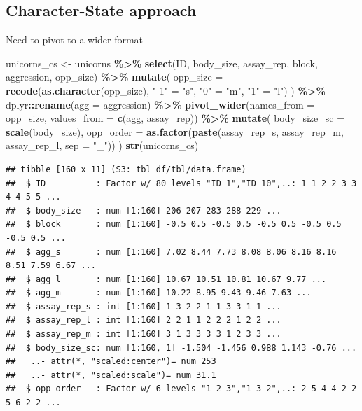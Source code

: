 \documentclass[
  12pt,
]{book}
\newenvironment{Shaded}{\begin{snugshade}}{\end{snugshade}}
\newcommand{\DataTypeTok}[1]{\textcolor[rgb]{0.13,0.29,0.53}{#1}}
\newcommand{\KeywordTok}[1]{\textcolor[rgb]{0.13,0.29,0.53}{\textbf{#1}}}
\newcommand{\NormalTok}[1]{#1}
\newcommand{\OperatorTok}[1]{\textcolor[rgb]{0.81,0.36,0.00}{\textbf{#1}}}
\newcommand{\StringTok}[1]{\textcolor[rgb]{0.31,0.60,0.02}{#1}}
\begin{document}
\hypertarget{character-state-approach}{%
\subsection{Character-State approach}\label{character-state-approach}}

Need to pivot to a wider format

\begin{Shaded}
\begin{Highlighting}[]
\NormalTok{unicorns\_cs \textless{}{-}}\StringTok{ }\NormalTok{unicorns }\OperatorTok{\%\textgreater{}\%}
\StringTok{  }\KeywordTok{select}\NormalTok{(ID, body\_size, assay\_rep, block, aggression, opp\_size) }\OperatorTok{\%\textgreater{}\%}
\StringTok{  }\KeywordTok{mutate}\NormalTok{(}
    \DataTypeTok{opp\_size =} \KeywordTok{recode}\NormalTok{(}\KeywordTok{as.character}\NormalTok{(opp\_size), }\StringTok{"{-}1"}\NormalTok{ =}\StringTok{ "s"}\NormalTok{, }\StringTok{"0"}\NormalTok{ =}\StringTok{ "m"}\NormalTok{, }\StringTok{"1"}\NormalTok{ =}\StringTok{ "l"}\NormalTok{)}
\NormalTok{  ) }\OperatorTok{\%\textgreater{}\%}
\StringTok{  }\NormalTok{dplyr}\OperatorTok{::}\KeywordTok{rename}\NormalTok{(}\DataTypeTok{agg =}\NormalTok{ aggression) }\OperatorTok{\%\textgreater{}\%}
\StringTok{  }\KeywordTok{pivot\_wider}\NormalTok{(}\DataTypeTok{names\_from =}\NormalTok{ opp\_size, }\DataTypeTok{values\_from =} \KeywordTok{c}\NormalTok{(agg, assay\_rep)) }\OperatorTok{\%\textgreater{}\%}
\StringTok{  }\KeywordTok{mutate}\NormalTok{(}
    \DataTypeTok{body\_size\_sc =} \KeywordTok{scale}\NormalTok{(body\_size),}
    \DataTypeTok{opp\_order =} \KeywordTok{as.factor}\NormalTok{(}\KeywordTok{paste}\NormalTok{(assay\_rep\_s, assay\_rep\_m, assay\_rep\_l, }\DataTypeTok{sep =} \StringTok{"\_"}\NormalTok{))}
\NormalTok{  )}
\KeywordTok{str}\NormalTok{(unicorns\_cs)}
\end{Highlighting}
\end{Shaded}

\begin{verbatim}
## tibble [160 x 11] (S3: tbl_df/tbl/data.frame)
##  $ ID          : Factor w/ 80 levels "ID_1","ID_10",..: 1 1 2 2 3 3 4 4 5 5 ...
##  $ body_size   : num [1:160] 206 207 283 288 229 ...
##  $ block       : num [1:160] -0.5 0.5 -0.5 0.5 -0.5 0.5 -0.5 0.5 -0.5 0.5 ...
##  $ agg_s       : num [1:160] 7.02 8.44 7.73 8.08 8.06 8.16 8.16 8.51 7.59 6.67 ...
##  $ agg_l       : num [1:160] 10.67 10.51 10.81 10.67 9.77 ...
##  $ agg_m       : num [1:160] 10.22 8.95 9.43 9.46 7.63 ...
##  $ assay_rep_s : int [1:160] 1 3 2 2 1 1 3 3 1 1 ...
##  $ assay_rep_l : int [1:160] 2 2 1 1 2 2 2 1 2 2 ...
##  $ assay_rep_m : int [1:160] 3 1 3 3 3 3 1 2 3 3 ...
##  $ body_size_sc: num [1:160, 1] -1.504 -1.456 0.988 1.143 -0.76 ...
##   ..- attr(*, "scaled:center")= num 253
##   ..- attr(*, "scaled:scale")= num 31.1
##  $ opp_order   : Factor w/ 6 levels "1_2_3","1_3_2",..: 2 5 4 4 2 2 5 6 2 2 ...
\end{verbatim}
\end{document}
